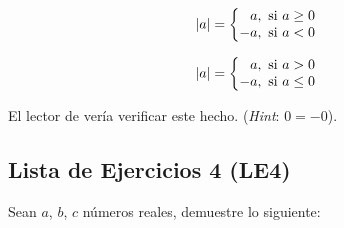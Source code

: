 \documentclass[11pt]{article}
\begin{document}
\begin{center}
\begin{minipage}[c]{.3\linewidth}
    \[|a| = \left\{
        \begin{array}{@{}r@{\thinspace}l}
            a, & \ \text{si} \ a\geq 0\\
            -a, & \ \text{si} \ a<0
        \end{array} \right.\]
    \end{minipage}%
\begin{minipage}[c]{.3\linewidth}
    \[|a| = \left\{
        \begin{array}{@{}r@{\thinspace}l}
            a, & \ \text{si} \ a>0\\
            -a, & \ \text{si} \ a\leq 0
        \end{array} \right.\]
\end{minipage}
\end{center}

El lector de vería verificar este hecho. (\textit{Hint}: $0=-0$).

\subsection*{Lista de Ejercicios 4 (LE4)}

Sean $a$, $b$, $c$ números reales, demuestre lo siguiente:
\end{document}
